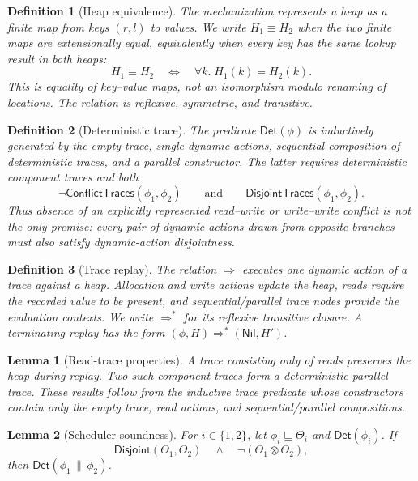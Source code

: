 \documentclass[10pt,a4paper]{article}
\newcommand{\conflict}{\mathrel{\otimes}}             %
\newcommand{\approxx}{\mathrel{\sqsubseteq}}          %
\newcommand{\Nil}{\mathsf{Nil}}
\newcommand{\Disjoint}{\mathsf{Disjoint}}
\newcommand{\DetTrace}{\mathsf{Det}}
\newtheorem{lemma}{Lemma}
\newtheorem{definition}{Definition}
\begin{document}
\begin{definition}[Heap equivalence]
The mechanization represents a heap as a finite map from keys $(r,l)$ to
values. We write $H_1 \equiv H_2$ when the two finite maps are extensionally
equal, equivalently when every key has the same lookup result in both heaps:
\[
H_1 \equiv H_2
\quad\Longleftrightarrow\quad
\forall k.\; H_1(k)=H_2(k).
\]
This is equality of key--value maps, not an isomorphism modulo renaming of
locations. The relation is reflexive, symmetric, and transitive.
\end{definition}

\begin{definition}[Deterministic trace]
The predicate $\DetTrace(\phi)$ is inductively generated by the empty trace,
single dynamic actions, sequential composition of deterministic traces, and a
parallel constructor. The latter requires deterministic component traces and
both
\[
\neg\mathsf{ConflictTraces}(\phi_1,\phi_2)
\qquad\text{and}\qquad
\mathsf{DisjointTraces}(\phi_1,\phi_2).
\]
Thus absence of an explicitly represented read--write or write--write conflict
is not the only premise: every pair of dynamic actions drawn from opposite
branches must also satisfy dynamic-action disjointness.
\end{definition}

\begin{definition}[Trace replay]
The relation $\Rightarrow$ executes one dynamic action of a trace against a
heap. Allocation and write actions update the heap, reads require the recorded
value to be present, and sequential/parallel trace nodes provide the evaluation
contexts. We write $\Rightarrow^{*}$ for its reflexive transitive closure.
A terminating replay has the form
$(\phi,H)\Rightarrow^{*}(\Nil,H')$.
\end{definition}

\begin{lemma}[Read-trace properties]
A trace consisting only of reads preserves the heap during replay. Two such
component traces form a deterministic parallel trace. These results follow from
the inductive trace predicate whose constructors contain only the empty trace,
read actions, and sequential/parallel compositions.
\end{lemma}

\begin{lemma}[Scheduler soundness]
For $i\in\{1,2\}$, let $\phi_i \approxx \Theta_i$ and
$\DetTrace(\phi_i)$. If
\[
\Disjoint(\Theta_1,\Theta_2)
\quad\land\quad
\neg(\Theta_1 \conflict \Theta_2),
\]
then $\DetTrace(\phi_1\,\|\,\phi_2)$.
\end{lemma}
\end{document}
